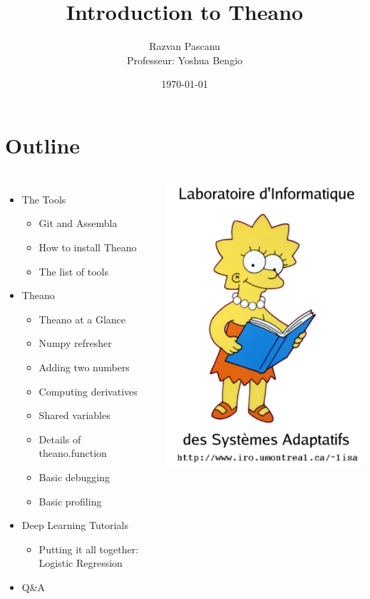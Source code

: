 \documentclass[9pt]{beamer}
\title[Theano Tutorial]{Introduction to Theano}
\author[Razvan Pascanu]{Razvan Pascanu\\ Professeur: Yoshua Bengio}
\date{\today}
\begin{document}
\frame{\titlepage}

\section*{Outline}
\begin{frame}
    \begin{columns}[b]
        \begin{itemize}
            \item The Tools
            \begin{itemize}
                \item Git and Assembla
                \item How to install Theano
                \item The list of tools
            \end{itemize}
            \item Theano
            \begin{itemize}
                \item Theano at a Glance
                \item Numpy refresher
                \item Adding two numbers
                \item Computing derivatives
                \item Shared variables
                \item Details of theano.function
                \item Basic debugging
                \item Basic profiling
            \end{itemize}
            \item Deep Learning Tutorials
            \begin{itemize}
                \item Putting it all together: Logistic Regression
            \end{itemize}
            \item Q\&A
        \end{itemize}
        \includegraphics[width=.6\textwidth]{pics/lisabook_logo_text2.png} 

\end{columns}
\end{frame}
\end{document}
